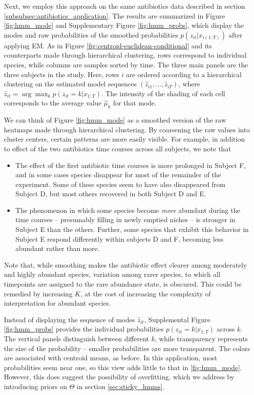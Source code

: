 \documentclass{article}
\begin{document}
Next, we employ this approach on the same antibiotics data described in section
\ref{subsubsec:antibiotics_application}. The results are summarized in Figure
\ref{fig:hmm_mode} and Supplementary Figure \ref{fig:hmm_probs}, which display
the modes and raw probabilities of the smoothed probabilities $p\left(z_{it}
\vert x_{i(1:T)}\right)$ after applying EM. As in Figure
\ref{fig:centroid-euclidean-conditional} and its counterparts made through
hierarchical clustering, rows correspond to individual species, while columns
are samples sorted by time. The three main panels are the three subjects in the
study. Here, rows $i$ are ordered according to a hierarchical clustering on the
estimated model sequences $\left(\hat{z}_{i1}, \dots, \hat{z}_{iT}\right)$,
where $\hat{z}_{it} = \arg \max_{k} p\left(z_{it} = k \vert x_{1:T}\right)$. The
intensity of the shading of each cell corresponds to the average value
$\hat{\mu}_{k}$ for that mode.

We can think of Figure \ref{fig:hmm_mode} as a smoothed version of the raw
heatmaps made through hierarchical clustering. By coarsening the raw values into
cluster centers, certain patterns are more easily visible. For example, in
addition to effect of the two antibiotics time courses across all subjects, we
note that

\begin{itemize}
\item The effect of the first antibiotic time courses is more prolonged in
  Subject F, and in some cases species disappear for most of the remainder of
  the experiment. Some of these species seem to have also disappeared from
  Subject D, but most others recovered in both Subject D and E.
\item The phenomenon in which some species become \textit{more} abundant during
  the time courses -- presumably filling in newly emptied niches -- is stronger
  in Subject E than the others. Further, some species that exhibit this behavior
  in Subject E respond differently within subjects D and F, becoming less
  abundant rather than more.
\end{itemize}

Note that, while smoothing makes the antibiotic effect clearer among moderately
and highly abundant species, variation among rarer species, to which all
timepoints are assigned to the rare abundance state, is obscured. This could be
remedied by increasing $K$, at the cost of increasing the complexity of
interpretation for abundant species.

Instead of displaying the sequence of modes $\hat{z}_{it}$, Supplemental Figure
\ref{fig:hmm_probs} provides the individual probabilities $p\left(z_{it} = k
\vert x_{1:T}\right)$ across $k$. The vertical panels distinguish between
different $k$, while transparency represents the size of the probability --
smaller probabilities are more transparent. The colors are associated with
centroid means, as before. In this application, most probabilities seem near
one, so this view adds little to that in \ref{fig:hmm_mode}. However, this does
suggest the possibility of overfitting, which we address by introducing priors
on $\Theta$ in section \ref{sec:sticky_hmms}.
\end{document}

